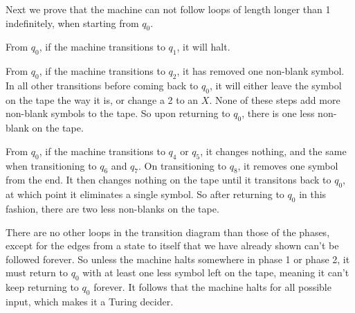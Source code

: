 \documentclass{article}
\begin{document}
\begin{enumerate}[(a)]
        Next we prove that the machine can not follow loops of length longer than 1 indefinitely, when starting from $q_0$.

        From $q_0$, if the machine transitions to $q_1$, it will halt. 

        From $q_0$, if the machine transitions to $q_2$, it has removed one non-blank symbol. In all other transitions before coming back to $q_0$, it will either leave the symbol on the tape the way it is, or change a 2 to an $X$. None of these steps add more non-blank symbols to the tape. So upon returning to $q_0$, there is one less non-blank on the tape.

        From $q_0$, if the machine transitions to $q_4$ or $q_5$, it changes nothing, and the same when transitioning to $q_6$ and $q_7$. On transitioning to $q_8$, it removes one symbol from the end. It then changes nothing on the tape until it transitons back to $q_0$, at which point it eliminates a single symbol. So after returning to $q_0$ in this fashion, there are two less non-blanks on the tape.

        There are no other loops in the transition diagram than those of the phases, except for the edges from a state to itself that we have already shown can't be followed forever. So unless the machine halts somewhere in phase 1 or phase 2, it must return to $q_0$ with at least one less symbol left on the tape, meaning it can't keep returning to $q_0$ forever. It follows that the machine halts for all possible input, which makes it a Turing decider.
\end{enumerate}
\end{document}

